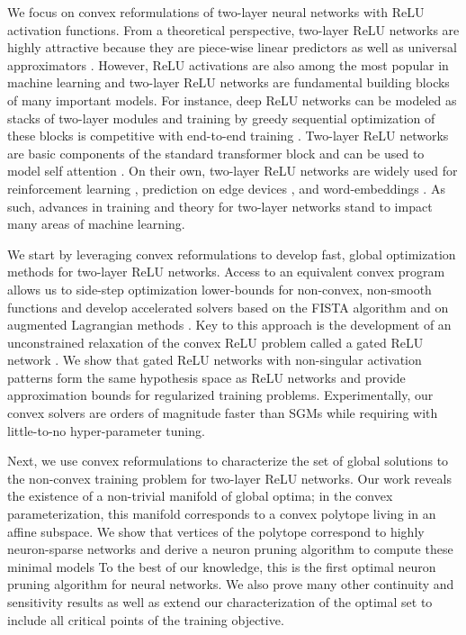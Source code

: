 We focus on convex reformulations of two-layer neural networks with ReLU
activation functions.
From a theoretical perspective, two-layer ReLU networks are highly attractive
because they are piece-wise linear predictors as well as universal
approximators \citep{huang2020universal}.
However, ReLU activations are also among the most popular in machine learning
\citep{szandala2020review} and two-layer ReLU networks are fundamental building
blocks of many important models.
For instance, deep ReLU networks can be modeled as stacks of two-layer modules
and training by greedy sequential optimization of these blocks is competitive
with end-to-end training \citep{belilovsky2019greedy}.
Two-layer ReLU networks are basic components of the standard transformer block
and can be used to model self attention \citep{sahiner2022attention}.
On their own, two-layer ReLU networks are widely used for reinforcement
learning \citep{gaur2023global}, prediction on edge devices
\citep{teerapittayanon2017distributed}, and word-embeddings
\citep{mikolov2013word}.
As such, advances in training and theory for two-layer networks stand to
impact many areas of machine learning.

We start by leveraging convex reformulations to develop fast, global
optimization methods for two-layer ReLU networks.
Access to an equivalent convex program allows us to side-step optimization
lower-bounds for non-convex, non-smooth functions and develop accelerated
solvers based on the FISTA algorithm \citep{beck2009fista} and on
augmented Lagrangian methods \citep{rockafellar1976augmented}.
Key to this approach is the development of an unconstrained relaxation of the
convex ReLU problem called a gated ReLU network \citep{fiat2019decoupling}.
We show that gated ReLU networks with non-singular activation patterns form the
same hypothesis space as ReLU networks and provide approximation bounds for
regularized training problems.
Experimentally, our convex solvers are orders of magnitude faster than SGMs
while requiring with little-to-no hyper-parameter tuning.

Next, we use convex reformulations to characterize the set of global
solutions to the non-convex training problem for two-layer ReLU networks.
Our work reveals the existence of a non-trivial manifold of global optima;
in the convex parameterization, this manifold corresponds to a convex polytope
living in an affine subspace.
We show that vertices of the polytope correspond to highly neuron-sparse
networks and derive a neuron pruning algorithm to compute these minimal models
To the best of our knowledge, this is the first optimal neuron pruning
algorithm for neural networks.
We also prove many other continuity and sensitivity results as well as extend
our characterization of the optimal set to include all critical points of the
training objective.

